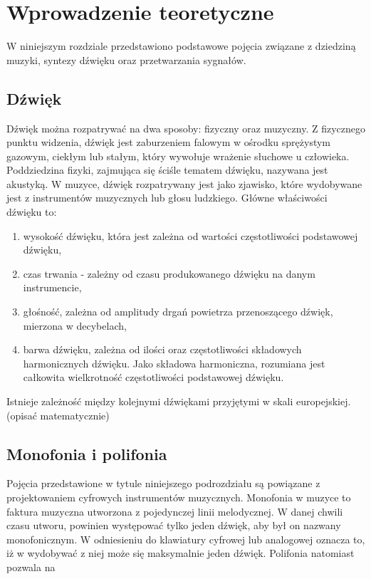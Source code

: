 \chapter{Wprowadzenie teoretyczne}\label{chapter2}

W niniejszym rozdziale przedstawiono podstawowe pojęcia związane z dziedziną muzyki, syntezy dźwięku oraz przetwarzania sygnałów. 

\section{Dźwięk}

Dźwięk można rozpatrywać na dwa sposoby: fizyczny oraz muzyczny. Z fizycznego punktu widzenia, dźwięk jest zaburzeniem falowym w ośrodku sprężystym gazowym, ciekłym lub stałym, który wywołuje wrażenie słuchowe u człowieka. Poddziedzina fizyki, zajmująca się ściśle tematem dźwięku, nazywana jest akustyką. %
W muzyce, dźwięk rozpatrywany jest jako zjawisko, które wydobywane jest z instrumentów muzycznych lub głosu ludzkiego. Główne właściwości dźwięku to:

\begin{enumerate}
	\item wysokość dźwięku, która jest zależna od wartości częstotliwości podstawowej dźwięku,
	
	\item czas trwania - zależny od czasu produkowanego dźwięku na danym instrumencie,
	
	\item głośność, zależna od amplitudy drgań powietrza przenoszącego dźwięk, mierzona w decybelach,
	
	\item barwa dźwięku, zależna od ilości oraz częstotliwości składowych harmonicznych dźwięku. Jako składowa harmoniczna, rozumiana jest całkowita wielkrotność częstotliwości podstawowej dźwięku.
\end{enumerate}


Istnieje zależność między kolejnymi dźwiękami przyjętymi w skali europejskiej. (opisać matematycznie)


\section{Monofonia i polifonia}
Pojęcia przedstawione w tytule niniejszego podrozdziału są powiązane z projektowaniem cyfrowych instrumentów muzycznych.
Monofonia w muzyce to faktura muzyczna utworzona z pojedynczej linii melodycznej. W danej chwili czasu utworu, powinien występować tylko jeden dźwięk, aby był on nazwany monofonicznym. W odniesieniu do klawiatury cyfrowej lub analogowej oznacza to, iż w wydobywać z niej może się maksymalnie jeden dźwięk.
Polifonia natomiast pozwala na 

